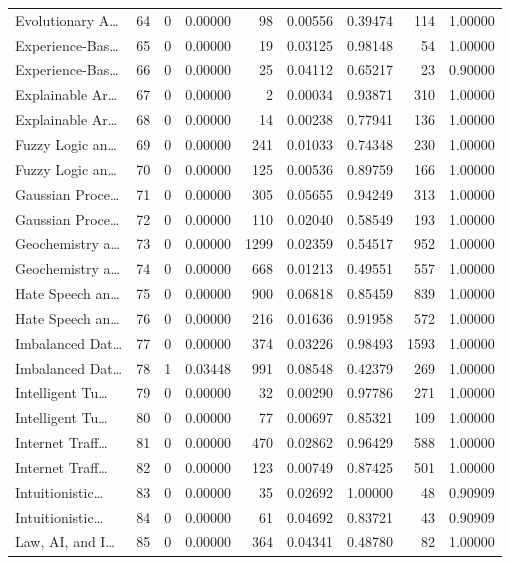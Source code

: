 \begin{table}
\begin{tabular}{lrrrrrrrr}
Evolutionary A… & 64 & 0 & 0.00000 & 98 & 0.00556 & 0.39474 & 114 & 1.00000 \\
Experience-Bas… & 65 & 0 & 0.00000 & 19 & 0.03125 & 0.98148 & 54 & 1.00000 \\
Experience-Bas… & 66 & 0 & 0.00000 & 25 & 0.04112 & 0.65217 & 23 & 0.90000 \\
Explainable Ar… & 67 & 0 & 0.00000 & 2 & 0.00034 & 0.93871 & 310 & 1.00000 \\
Explainable Ar… & 68 & 0 & 0.00000 & 14 & 0.00238 & 0.77941 & 136 & 1.00000 \\
Fuzzy Logic an… & 69 & 0 & 0.00000 & 241 & 0.01033 & 0.74348 & 230 & 1.00000 \\
Fuzzy Logic an… & 70 & 0 & 0.00000 & 125 & 0.00536 & 0.89759 & 166 & 1.00000 \\
Gaussian Proce… & 71 & 0 & 0.00000 & 305 & 0.05655 & 0.94249 & 313 & 1.00000 \\
Gaussian Proce… & 72 & 0 & 0.00000 & 110 & 0.02040 & 0.58549 & 193 & 1.00000 \\
Geochemistry a… & 73 & 0 & 0.00000 & 1299 & 0.02359 & 0.54517 & 952 & 1.00000 \\
Geochemistry a… & 74 & 0 & 0.00000 & 668 & 0.01213 & 0.49551 & 557 & 1.00000 \\
Hate Speech an… & 75 & 0 & 0.00000 & 900 & 0.06818 & 0.85459 & 839 & 1.00000 \\
Hate Speech an… & 76 & 0 & 0.00000 & 216 & 0.01636 & 0.91958 & 572 & 1.00000 \\
Imbalanced Dat… & 77 & 0 & 0.00000 & 374 & 0.03226 & 0.98493 & 1593 & 1.00000 \\
Imbalanced Dat… & 78 & 1 & 0.03448 & 991 & 0.08548 & 0.42379 & 269 & 1.00000 \\
Intelligent Tu… & 79 & 0 & 0.00000 & 32 & 0.00290 & 0.97786 & 271 & 1.00000 \\
Intelligent Tu… & 80 & 0 & 0.00000 & 77 & 0.00697 & 0.85321 & 109 & 1.00000 \\
Internet Traff… & 81 & 0 & 0.00000 & 470 & 0.02862 & 0.96429 & 588 & 1.00000 \\
Internet Traff… & 82 & 0 & 0.00000 & 123 & 0.00749 & 0.87425 & 501 & 1.00000 \\
Intuitionistic… & 83 & 0 & 0.00000 & 35 & 0.02692 & 1.00000 & 48 & 0.90909 \\
Intuitionistic… & 84 & 0 & 0.00000 & 61 & 0.04692 & 0.83721 & 43 & 0.90909 \\
Law, AI, and I… & 85 & 0 & 0.00000 & 364 & 0.04341 & 0.48780 & 82 & 1.00000 \\

\end{tabular}
\end{table}
